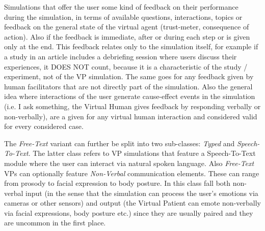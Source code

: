 Simulations that offer the user some kind of feedback on their performance during the simulation, in terms of available questions, interactions, topics or feedback on the general state of the virtual agent (trust-meter, consequence of action). Also if the feedback is immediate, after or during each step or is given only at the end. This feedback relates only to the simulation itself, for example if a study in an article includes a debriefing session where users discuss their experiences, it DOES NOT count, because it is a characteristic of the study / experiment, not of the VP simulation. The same goes for any feedback given by human facilitators that are not directly part of the simulation. Also the general idea where interactions of the user generate cause-effect events in the simulation (i.e. I ask something, the Virtual Human gives feedback by responding verbally or non-verbally), are a given for any virtual human interaction and considered valid for every considered case.

The \emph{Free-Text} variant can further be split into two sub-classes: \emph{Typed} and \emph{Speech-To-Text}. The latter class refers to VP simulations that feature a Speech-To-Text module where the user can interact via natural spoken language. Also \emph{Free-Text} VPs can optionally feature \emph{Non-Verbal} communication elements. These can range from prosody to facial expression to body posture. In this class fall both non-verbal input (in the sense that the simulation can process the user's emotions via cameras or other sensors) and output (the Virtual Patient can emote non-verbally via facial expressions, body posture etc.) since they are usually paired and they are uncommon in the first place. 




